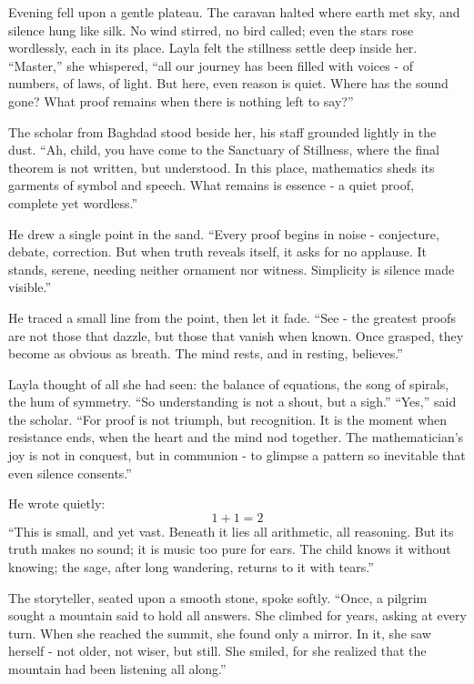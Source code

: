 \documentclass[
  letterpaper,
  DIV=11,
  numbers=noendperiod]{scrreprt}
\begin{document}
Evening fell upon a gentle plateau. The caravan halted where earth met
sky, and silence hung like silk. No wind stirred, no bird called; even
the stars rose wordlessly, each in its place. Layla felt the stillness
settle deep inside her. ``Master,'' she whispered, ``all our journey has
been filled with voices - of numbers, of laws, of light. But here, even
reason is quiet. Where has the sound gone? What proof remains when there
is nothing left to say?''

The scholar from Baghdad stood beside her, his staff grounded lightly in
the dust. ``Ah, child, you have come to the Sanctuary of Stillness,
where the final theorem is not written, but understood. In this place,
mathematics sheds its garments of symbol and speech. What remains is
essence - a quiet proof, complete yet wordless.''

He drew a single point in the sand. ``Every proof begins in noise -
conjecture, debate, correction. But when truth reveals itself, it asks
for no applause. It stands, serene, needing neither ornament nor
witness. Simplicity is silence made visible.''

He traced a small line from the point, then let it fade. ``See - the
greatest proofs are not those that dazzle, but those that vanish when
known. Once grasped, they become as obvious as breath. The mind rests,
and in resting, believes.''

Layla thought of all she had seen: the balance of equations, the song of
spirals, the hum of symmetry. ``So understanding is not a shout, but a
sigh.'' ``Yes,'' said the scholar. ``For proof is not triumph, but
recognition. It is the moment when resistance ends, when the heart and
the mind nod together. The mathematician's joy is not in conquest, but
in communion - to glimpse a pattern so inevitable that even silence
consents.''

He wrote quietly: \[
1 + 1 = 2
\] ``This is small, and yet vast. Beneath it lies all arithmetic, all
reasoning. But its truth makes no sound; it is music too pure for ears.
The child knows it without knowing; the sage, after long wandering,
returns to it with tears.''

The storyteller, seated upon a smooth stone, spoke softly. ``Once, a
pilgrim sought a mountain said to hold all answers. She climbed for
years, asking at every turn. When she reached the summit, she found only
a mirror. In it, she saw herself - not older, not wiser, but still. She
smiled, for she realized that the mountain had been listening all
along.''
\end{document}
